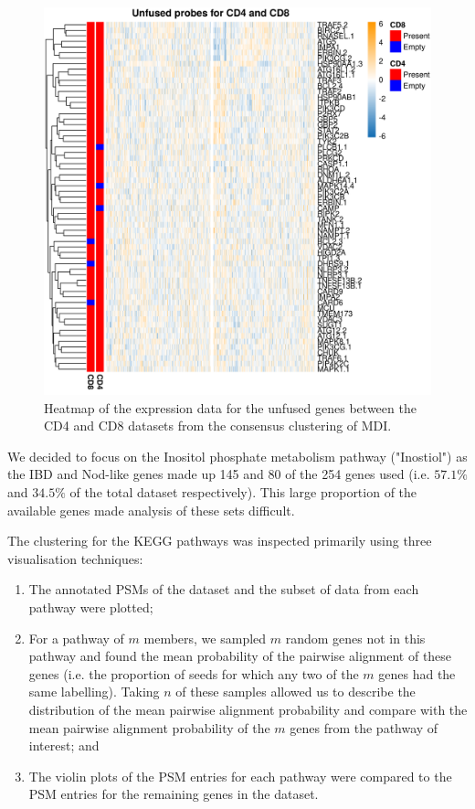 \documentclass[12pt]{article} %
\begin{document}
	\begin{figure}[h]
		\centering
		\includegraphics[scale=0.75]{Images/Biology_data/All_datasets/Fusion_expression_data/heatmap_unfused_genes_CD4_CD8.png}
		\caption{Heatmap of the expression data for the unfused genes between the CD4 and CD8 datasets from the consensus clustering of MDI.}
		\label{fig:mdi_cd4_cd8_unfused_genes}
	\end{figure}
		
	\newpage
	
	We decided to focus on the Inositol phosphate metabolism pathway ("Inostiol") as the IBD and Nod-like genes made up 145 and 80 of the 254 genes used (i.e. $57.1\%$ and $34.5\%$ of the total dataset respectively). This large proportion of the available genes made analysis of these sets difficult.
	
	The clustering for the KEGG pathways was inspected primarily using three visualisation techniques:
	\begin{enumerate}
		\item The annotated PSMs of the dataset and the subset of data from each pathway were plotted;
		\item For a pathway of $m$ members, we sampled $m$ random genes not in this pathway and found the mean probability of the pairwise alignment of these genes (i.e. the proportion of seeds for which any two of the $m$ genes had the same labelling). Taking $n$ of these samples allowed us to describe the distribution of the mean pairwise alignment probability and compare with the mean pairwise alignment probability of the $m$ genes from the pathway of interest; and
		\item The violin plots of the PSM entries for each pathway were compared to the PSM entries for the remaining genes in the dataset.
	\end{enumerate}
	
\end{document}
